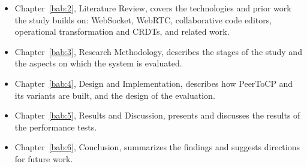 \begin{itemize}
    \item Chapter~\ref{bab:2}, Literature Review, covers the technologies and prior work the study builds on: WebSocket, WebRTC, collaborative code editors, operational transformation and CRDTs, and related work.
    \item Chapter~\ref{bab:3}, Research Methodology, describes the stages of the study and the aspects on which the system is evaluated.
    \item Chapter~\ref{bab:4}, Design and Implementation, describes how PeerToCP and its variants are built, and the design of the evaluation.
    \item Chapter~\ref{bab:5}, Results and Discussion, presents and discusses the results of the performance tests.
    \item Chapter~\ref{bab:6}, Conclusion, summarizes the findings and suggests directions for future work.
\end{itemize}
